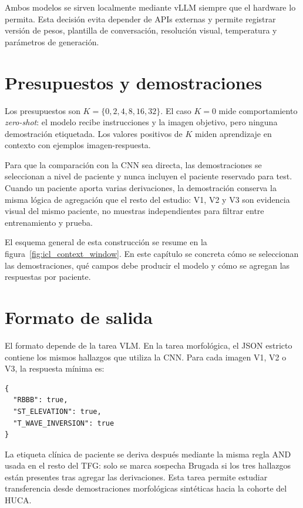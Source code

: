 Ambos modelos se sirven localmente mediante vLLM siempre que el hardware lo permita. Esta decisión evita depender de APIs externas y permite registrar versión de pesos, plantilla de conversación, resolución visual, temperatura y parámetros de generación.

\section{Presupuestos y demostraciones}

Los presupuestos son \(K=\{0,2,4,8,16,32\}\). El caso \(K=0\) mide comportamiento \emph{zero-shot}: el modelo recibe instrucciones y la imagen objetivo, pero ninguna demostración etiquetada. Los valores positivos de \(K\) miden aprendizaje en contexto con ejemplos imagen-respuesta.

Para que la comparación con la CNN sea directa, las demostraciones se seleccionan a nivel de paciente y nunca incluyen el paciente reservado para test. Cuando un paciente aporta varias derivaciones, la demostración conserva la misma lógica de agregación que el resto del estudio: V1, V2 y V3 son evidencia visual del mismo paciente, no muestras independientes para filtrar entre entrenamiento y prueba.

El esquema general de esta construcción se resume en la figura~\ref{fig:icl_context_window}. En este capítulo se concreta cómo se seleccionan las demostraciones, qué campos debe producir el modelo y cómo se agregan las respuestas por paciente.

\section{Formato de salida}

El formato depende de la tarea VLM. En la tarea morfológica, el JSON estricto contiene los mismos hallazgos que utiliza la CNN. Para cada imagen V1, V2 o V3, la respuesta mínima es:

\begin{lstlisting}
{
  "RBBB": true,
  "ST_ELEVATION": true,
  "T_WAVE_INVERSION": true
}
\end{lstlisting}

La etiqueta clínica de paciente se deriva después mediante la misma regla AND usada en el resto del TFG: solo se marca sospecha Brugada si los tres hallazgos están presentes tras agregar las derivaciones. Esta tarea permite estudiar transferencia desde demostraciones morfológicas sintéticas hacia la cohorte del HUCA.

